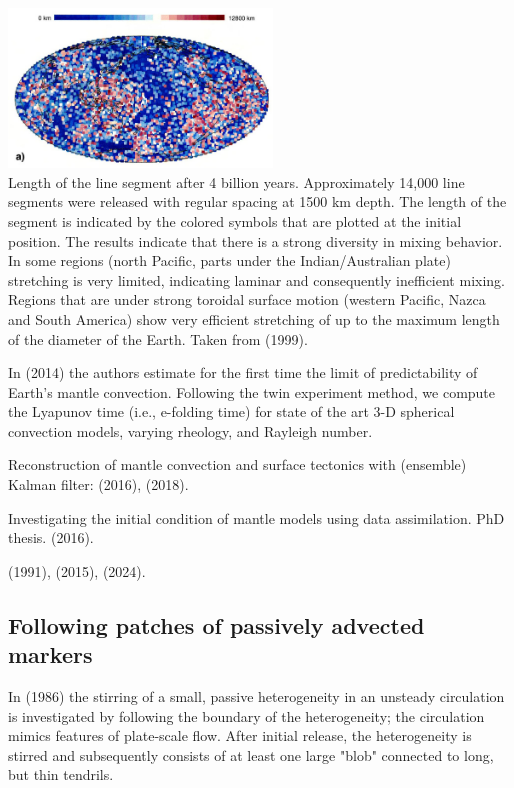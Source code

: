 \begin{center}
\includegraphics[width=7cm]{images/mixing/vazh99b}\\
{\captionfont Length
of the line segment after 4 billion years. Approximately 14,000 line segments were released with 
regular spacing at 1500 km depth. The length of the segment is indicated by the colored symbols 
that are plotted at the initial position. The results indicate that there is a strong
diversity in mixing behavior. In some regions (north Pacific, parts under the Indian/Australian plate) 
stretching is very limited, indicating laminar and consequently inefficient mixing. Regions that 
are under strong toroidal surface motion (western Pacific, Nazca and South
America) show very efficient stretching of up to the maximum length of the diameter of the Earth. 
Taken from \textcite{vazh99} (1999).}
\end{center}


In \textcite{becr14} (2014) the authors estimate for the ﬁrst time the limit of predictability of Earth’s
mantle convection. Following the twin experiment method, we compute the Lyapunov time (i.e., e-folding
time) for state of the art 3-D spherical convection models, varying rheology, and Rayleigh number.


Reconstruction of mantle convection and surface tectonics with (ensemble) Kalman filter:
\textcite{bocf16} (2016),
\textcite{bofc18} (2018).

Investigating the initial condition
of mantle models using data assimilation. PhD thesis. \textcite{pric16} (2016).


\Literature

\textcite{pier91} (1991),
\textcite{cobs15} (2015),
\textcite{thsf24} (2024).

\subsection{Following patches of passively advected markers}

In \textcite{gurn86} (1986) the stirring
of a small, passive
heterogeneity
in an unsteady circulation
is investigated by following
the boundary of the heterogeneity;
the circulation mimics features
of plate-scale flow.
After initial release,
the heterogeneity is stirred
and subsequently consists of at least one
large "blob" connected to long, but thin tendrils.

